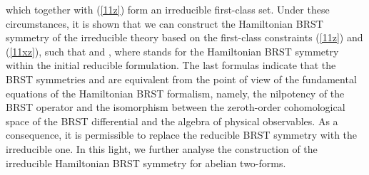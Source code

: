 \documentclass[a4paper,12pt]{article}
\begin{document}
which together with (\ref{11z}) form an irreducible first-class set. Under
these circumstances, it is shown \cite{24} that we can construct the
Hamiltonian BRST symmetry \coordHE{} of the irreducible theory based on the
first-class constraints (\ref{11z}) and (\ref{11xz}), such that \coordHE{} and \coordHE{}, where \coordHE{} stands for the Hamiltonian BRST symmetry
within the initial reducible formulation. The last formulas indicate that
the BRST symmetries \coordHE{} and \coordHE{} are equivalent from the point of
view of the fundamental equations of the Hamiltonian BRST formalism, namely,
the nilpotency of the BRST operator and the isomorphism between the
zeroth-order cohomological space of the BRST differential and the algebra of
physical observables. As a consequence, it is permissible to replace the
reducible BRST symmetry with the irreducible one. In this light, we further
analyse the construction of the irreducible Hamiltonian BRST symmetry for
abelian two-forms.
\end{document}
